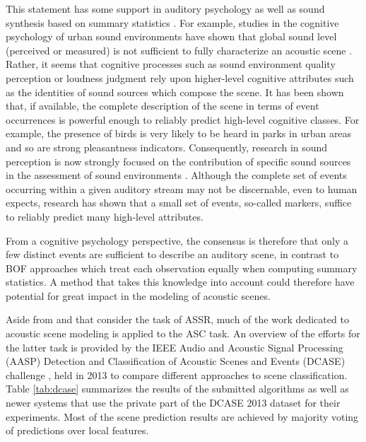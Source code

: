 \documentclass[journal]{IEEEtran}
\begin{document}
This statement has some support in auditory psychology as well as sound synthesis based on summary statistics \cite{mcdermott2013summary}. For example, studies in the cognitive psychology of urban sound environments have shown that global sound level (perceived or measured) is not sufficient to fully characterize an acoustic scene \cite{guyot2005urban,kang2006urban}. Rather, it seems that cognitive processes such as sound environment quality perception \cite{dubois2006cognitive} or loudness judgment \cite{kuwano_memory_2003} rely upon higher-level cognitive attributes such as the identities of sound sources which compose the scene. It has been shown that, if available, the complete description of the scene in terms of event occurrences is powerful enough to reliably predict high-level cognitive classes. For example, the presence of birds is very likely to be heard in parks in urban areas and so are strong pleasantness indicators. Consequently, research in sound perception is now strongly focused on the contribution of specific sound sources in the assessment of sound environments \cite{ricciardi2015sound,lavandier2006contribution}. Although the complete set of events occurring within a given auditory stream may not be discernable, even to human expects, research has shown that a small set of events, so-called markers, suffice to reliably predict many high-level attributes.

From a cognitive psychology perspective, the consensus is therefore that only a few distinct events are sufficient to describe an auditory scene, in contrast to BOF approaches which treat each observation equally when computing summary statistics. A method that takes this knowledge into account could therefore have potential for great impact in the modeling of acoustic scenes.

Aside from \cite{aucouturier2007bag} and \cite{lagrange:hal-01082501} that consider the task of ASSR, much of the work dedicated to acoustic scene modeling is applied to the ASC task.
An overview of the efforts for the latter task is provided by the IEEE Audio and Acoustic Signal Processing (AASP) Detection and Classification of Acoustic Scenes and Events (DCASE) challenge \cite{barchiesi2015acoustic}, held in 2013 to compare different approaches to scene classification. Table \ref{tab:dcase} summarizes the results of the submitted algorithms as well as newer systems that use the private part of the DCASE 2013 dataset for their experiments. Most of the scene prediction results are achieved by majority voting of predictions over local features.
\end{document}
